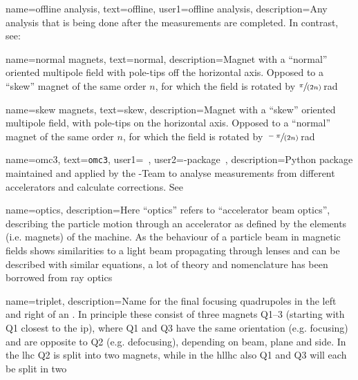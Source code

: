 {
        name={offline analysis},
        text=offline,
        user1={offline analysis},
        description={Any analysis that is being done after the measurements are completed.
        In contrast, see: }
}

{
        name={normal magnets},
        text=normal,
        description={Magnet with a ``normal'' oriented multipole field with pole-tips off the horizontal axis. 
        Opposed to a ``\gls{skew}'' magnet of the same order $n$, for which the field is rotated by $\sfrac{\pi}{(2n)}$\,\si{\radian}}
}

{
        name={skew magnets},
        text=skew,
        description={Magnet with a ``skew'' oriented multipole field, with pole-tips on the horizontal axis. 
        Opposed to a ``\gls{normal}'' magnet of the same order $n$, for which the field is rotated by $\sfrac{-\pi}{(2n)}$\,\si{\radian}}
}

{
        name={omc3},
        text={\texttt{omc3}},
        user1={\glstext{\glslabel}~\cite{CODE:OMC:omc3}},
        user2={\glstext{\glslabel}-package~\cite{CODE:OMC:omc3}},
        description={Python package maintained and applied by the -Team to analyse 
        measurements from different accelerators and calculate corrections. See~\cite{CODE:OMC:omc3}}
}

{
        name={optics},
        description={Here ``optics'' refers to ``accelerator \gls{beam} optics'',
        describing the particle motion through an accelerator as defined by the elements
        (i.e. magnets) of the machine. As the behaviour of a particle \gls{beam} in magnetic fields shows 
        similarities to a light beam propagating through lenses and can be described with similar equations,
         a lot of theory and nomenclature has been borrowed from ray optics%
        }
}

{
        name=triplet,
        description={Name for the final focusing quadrupoles in the 
         left and right of an .
        In principle these consist of three magnets Q1--3 (starting with Q1 closest to the 
        \acrshort{ip}), where Q1 and Q3 have the same orientation (e.g. focusing) and are opposite
        to Q2 (e.g. defocusing), depending on \gls{beam}, plane and side.
        In the \acrfull{lhc} Q2 is split into two magnets, 
        while in the \acrfull{hllhc} also Q1 and Q3 will each be split in two%
        }
}

